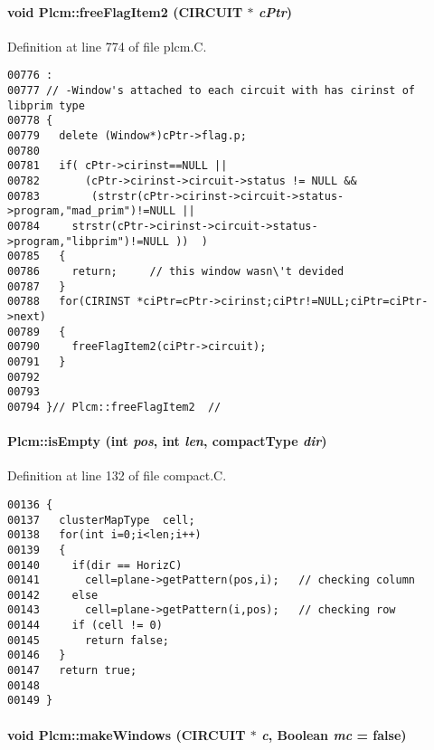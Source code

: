 \paragraph{\setlength{\rightskip}{0pt plus 5cm}void Plcm::free\-Flag\-Item2 (CIRCUIT $\ast$ {\em c\-Ptr})\hspace{0.3cm}{\tt  [private]}}\hfill



Definition at line 774 of file plcm.C.\small\begin{verbatim}00776 :
00777 // -Window's attached to each circuit with has cirinst of libprim type
00778 {
00779   delete (Window*)cPtr->flag.p;
00780 
00781   if( cPtr->cirinst==NULL || 
00782       (cPtr->cirinst->circuit->status != NULL &&
00783        (strstr(cPtr->cirinst->circuit->status->program,"mad_prim")!=NULL ||
00784     strstr(cPtr->cirinst->circuit->status->program,"libprim")!=NULL ))  ) 
00785   {
00786     return;     // this window wasn\'t devided
00787   }
00788   for(CIRINST *ciPtr=cPtr->cirinst;ciPtr!=NULL;ciPtr=ciPtr->next)
00789   {
00790     freeFlagItem2(ciPtr->circuit);
00791   }
00792 
00793 
00794 }// Plcm::freeFlagItem2  //

\end{verbatim}\normalsize 
\label{Plcm_c17}
\paragraph{ Plcm::is\-Empty (int {\em pos}, int {\em len}, {\bf compact\-Type} {\em dir})\hspace{0.3cm}{\tt  [private]}}\hfill



Definition at line 132 of file compact.C.\small\begin{verbatim}00136 {
00137   clusterMapType  cell;
00138   for(int i=0;i<len;i++)
00139   {
00140     if(dir == HorizC)
00141       cell=plane->getPattern(pos,i);   // checking column 
00142     else
00143       cell=plane->getPattern(i,pos);   // checking row
00144     if (cell != 0)
00145       return false;
00146   }
00147   return true;
00148 
00149 }
\end{verbatim}\normalsize 
\label{Plcm_c5}
\paragraph{\setlength{\rightskip}{0pt plus 5cm}void Plcm::make\-Windows (CIRCUIT $\ast$ {\em c}, {\bf Boolean} {\em mc} = false)\hspace{0.3cm}{\tt  [private]}}\hfill

